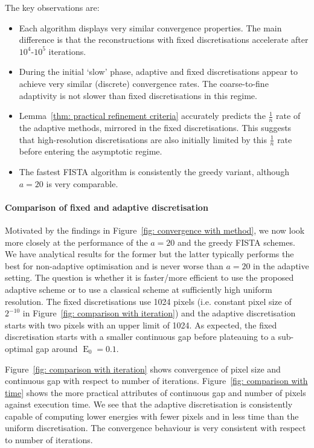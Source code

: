 \documentclass[smallextended]{svjour3}
\newcommand{\op}[1]{\operatorname{#1}}
\newcommand{\1}{\F{1}}
\begin{document}
	The key observations are:
	\begin{itemize}
		\item Each algorithm displays very similar convergence properties. The main difference is that the reconstructions with fixed discretisations accelerate after $10^4$-$10^5$ iterations.
		\item During the initial `slow' phase, adaptive and fixed discretisations appear to achieve very similar (discrete) convergence rates. The coarse-to-fine adaptivity is not slower than fixed discretisations in this regime.
		\item Lemma~\ref{thm: practical refinement criteria} accurately predicts the $\frac1n$ rate of the adaptive methods, mirrored in the fixed discretisations. This suggests that high-resolution discretisations are also initially limited by this $\frac1n$ rate before entering the asymptotic regime.
		\item The fastest FISTA algorithm is consistently the greedy variant, although $a=20$ is very comparable.
	\end{itemize}
	
	\paragraph{Comparison of fixed and adaptive discretisation}
	Motivated by the findings in Figure~\ref{fig: convergence with method}, we now look more closely at the performance of the $a=20$ and the greedy FISTA schemes. We have analytical results for the former but the latter typically performs the best for non-adaptive optimisation and is never worse than $a=20$ in the adaptive setting. The question is whether it is faster/more efficient to use the proposed adaptive scheme or to use a classical scheme at sufficiently high uniform resolution. The fixed discretisations use 1024 pixels (i.e. constant pixel size of $2^{-10}$ in Figure~\ref{fig: comparison with iteration}) and the adaptive discretisation starts with two pixels with an upper limit of 1024. As expected, the fixed discretisation starts with a smaller continuous gap before plateauing to a sub-optimal gap around $\op{E}_0=0.1$.
	
	Figure~\ref{fig: comparison with iteration} shows convergence of pixel size and continuous gap with respect to number of iterations. Figure~\ref{fig: comparison with time} shows the more practical attributes of continuous gap and number of pixels against execution time. We see that the adaptive discretisation is consistently capable of computing lower energies with fewer pixels and in less time than the uniform discretisation. The convergence behaviour is very consistent with respect to number of iterations.
	
\end{document}

